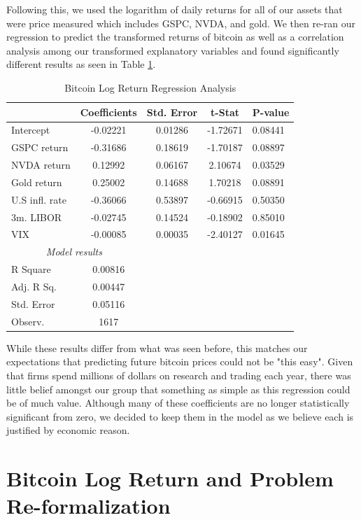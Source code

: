 \documentclass[9pt,twocolumn,twoside]{ilcss}
\begin{document}
Following this, we used the logarithm of daily returns for all of our assets that were price measured which includes GSPC, NVDA, and gold. We then re-ran our regression to predict the transformed returns of bitcoin as well as a correlation analysis among our transformed explanatory variables and found significantly different results as seen in Table \ref{BTC_log_return_reg_analysis}. 

\begin{table}[h]
\centering
\caption{Bitcoin Log Return Regression Analysis}
\label{BTC_log_return_reg_analysis}
\begin{tabular}{lcccl} 
\hline
\hline
& Coefficients & Std. Error & t-Stat & P-value\\
\hline
Intercept & -0.02221 & 0.01286 & -1.72671 & 0.08441\\
GSPC return & -0.31686 & 0.18619 & -1.70187 & 0.08897\\
NVDA return & 0.12992 & 0.06167 & 2.10674 & 0.03529\\
Gold return & 0.25002 & 0.14688 & 1.70218 & 0.08891\\
U.S infl. rate & -0.36066 & 0.53897 & -0.66915 & 0.50350\\
3m. LIBOR & -0.02745 & 0.14524 & -0.18902 & 0.85010\\
VIX & -0.00085 & 0.00035 & -2.40127 & 0.01645  \\
\hline
\multicolumn{2}{c}{\textit{Model results}}\\
\cline{1-2}
R Square & 0.00816 \\
Adj. R Sq. & 0.00447 \\
Std. Error & 0.05116 \\
Observ. & 1617 \\
\hline
\end{tabular}
\end{table}

While these results differ from what was seen before, this matches our expectations that predicting future bitcoin prices could not be "this easy". Given that firms spend millions of dollars on research and trading each year, there was little belief amongst our group that something as simple as this regression could be of much value. Although many of these coefficients are no longer statistically significant from zero, we decided to keep them in the model as we believe each is justified by economic reason.

\section{Bitcoin Log Return and Problem Re-formalization}
\end{document}
